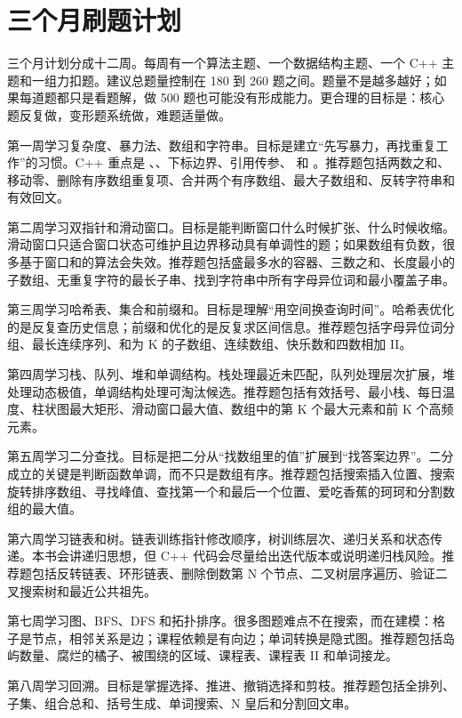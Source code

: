 \chapter{三个月刷题计划}

三个月计划分成十二周。每周有一个算法主题、一个数据结构主题、一个 C++ 主题和一组力扣题。建议总题量控制在 180 到 260 题之间。题量不是越多越好；如果每道题都只是看题解，做 500 题也可能没有形成能力。更合理的目标是：核心题反复做，变形题系统做，难题适量做。

第一周学习复杂度、暴力法、数组和字符串。目标是建立“先写暴力，再找重复工作”的习惯。C++ 重点是 、、下标边界、引用传参、 和 。推荐题包括两数之和、移动零、删除有序数组重复项、合并两个有序数组、最大子数组和、反转字符串和有效回文。

第二周学习双指针和滑动窗口。目标是能判断窗口什么时候扩张、什么时候收缩。滑动窗口只适合窗口状态可维护且边界移动具有单调性的题；如果数组有负数，很多基于窗口和的算法会失效。推荐题包括盛最多水的容器、三数之和、长度最小的子数组、无重复字符的最长子串、找到字符串中所有字母异位词和最小覆盖子串。

第三周学习哈希表、集合和前缀和。目标是理解“用空间换查询时间”。哈希表优化的是反复查历史信息；前缀和优化的是反复求区间信息。推荐题包括字母异位词分组、最长连续序列、和为 K 的子数组、连续数组、快乐数和四数相加 II。

第四周学习栈、队列、堆和单调结构。栈处理最近未匹配，队列处理层次扩展，堆处理动态极值，单调结构处理可淘汰候选。推荐题包括有效括号、最小栈、每日温度、柱状图最大矩形、滑动窗口最大值、数组中的第 K 个最大元素和前 K 个高频元素。

第五周学习二分查找。目标是把二分从“找数组里的值”扩展到“找答案边界”。二分成立的关键是判断函数单调，而不只是数组有序。推荐题包括搜索插入位置、搜索旋转排序数组、寻找峰值、查找第一个和最后一个位置、爱吃香蕉的珂珂和分割数组的最大值。

第六周学习链表和树。链表训练指针修改顺序，树训练层次、递归关系和状态传递。本书会讲递归思想，但 C++ 代码会尽量给出迭代版本或说明递归栈风险。推荐题包括反转链表、环形链表、删除倒数第 N 个节点、二叉树层序遍历、验证二叉搜索树和最近公共祖先。

第七周学习图、BFS、DFS 和拓扑排序。很多图题难点不在搜索，而在建模：格子是节点，相邻关系是边；课程依赖是有向边；单词转换是隐式图。推荐题包括岛屿数量、腐烂的橘子、被围绕的区域、课程表、课程表 II 和单词接龙。

第八周学习回溯。目标是掌握选择、推进、撤销选择和剪枝。推荐题包括全排列、子集、组合总和、括号生成、单词搜索、N 皇后和分割回文串。

